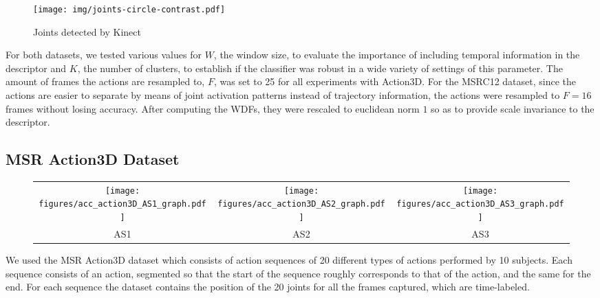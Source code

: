 \documentclass{fcs}
\begin{document}
\begin{figure}[!ht]
\centering
\texttt{[image: img/joints-circle-contrast.pdf]}
\caption{Joints detected by Kinect}
\label{kinect_joints}
\end{figure}


For both datasets, we tested various values for $W$, the window size, to evaluate the importance of including temporal information in the descriptor and $K$, the number of clusters, to establish if the classifier was robust in a wide variety of settings of this parameter. The amount of frames the actions are resampled to, $F$, was set to 25 for all experiments with Action3D.  For the MSRC12 dataset, since the actions are easier to separate by means of joint activation patterns instead of trajectory information, the actions were resampled to $F=16$ frames without losing accuracy. After computing the WDFs, they were rescaled to euclidean norm $1$ so as to provide scale invariance to the descriptor.

\subsection{MSR Action3D Dataset}
\label{action3d}
\begin{figure*}[t]
\doublerulesep 0.1pt
\begin{footnotesize}
\begin{tabular}{ c c c } 
\texttt{[image: figures/acc\_action3D\_AS1\_graph.pdf]} &
\texttt{[image: figures/acc\_action3D\_AS2\_graph.pdf]} &
\texttt{[image: figures/acc\_action3D\_AS3\_graph.pdf]} \\
AS1 & AS2 & AS3 \\
\end{tabular}
\centering
{}
\label{figure_acc_Action3D}
\end{footnotesize}
\end{figure*}

We used the MSR Action3D dataset \cite{li2010action} which consists of action sequences of 20 different types of actions performed by 10 subjects. Each sequence consists of an action, segmented so that the start of the sequence roughly corresponds to that of the action, and the same for the end. For each sequence the dataset contains the position of the 20 joints for all the frames captured, which are time-labeled.
\end{document}
